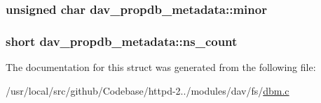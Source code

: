 \subsubsection[{\texorpdfstring{minor}{minor}}]{\setlength{\rightskip}{0pt plus 5cm}unsigned char dav\+\_\+propdb\+\_\+metadata\+::minor}\hypertarget{structdav__propdb__metadata_a5a91e65bc6cbc26135eb36362f5eed48}{}\label{structdav__propdb__metadata_a5a91e65bc6cbc26135eb36362f5eed48}
\subsubsection[{\texorpdfstring{ns\+\_\+count}{ns_count}}]{\setlength{\rightskip}{0pt plus 5cm}short dav\+\_\+propdb\+\_\+metadata\+::ns\+\_\+count}\hypertarget{structdav__propdb__metadata_a5c548115d5a2f4212ae9890026053b34}{}\label{structdav__propdb__metadata_a5c548115d5a2f4212ae9890026053b34}


The documentation for this struct was generated from the following file\+:\begin{DoxyCompactItemize}
\item 
/usr/local/src/github/\+Codebase/httpd-\/2../modules/dav/fs/\hyperlink{dbm_8c}{dbm.\+c}\end{DoxyCompactItemize}
